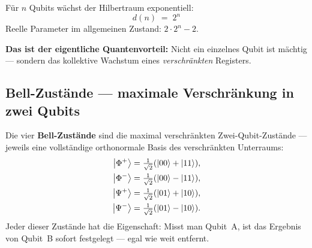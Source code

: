 Für $n$ Qubits wächst der Hilbertraum exponentiell:
\begin{equation}
  \boxed{d(n) \;=\; 2^n}
\end{equation}
Reelle Parameter im allgemeinen Zustand: $2 \cdot 2^n - 2$.

\begin{center}
\end{center}

\textbf{Das ist der eigentliche Quantenvorteil:}
Nicht ein einzelnes Qubit ist mächtig ---
sondern das kollektive Wachstum eines
\emph{verschränkten} Registers.

\subsection{Bell-Zustände --- maximale Verschränkung in zwei Qubits}
\label{sec:bell}

Die vier \textbf{Bell-Zustände} sind die
maximal verschränkten Zwei-Qubit-Zustände ---
jeweils eine vollständige orthonormale Basis
des verschränkten Unterraums:
\begin{align}
  \left|\Phi^+\right\rangle &= \tfrac{1}{\sqrt{2}}(\left|00\right\rangle + \left|11\right\rangle), \\
  \left|\Phi^-\right\rangle &= \tfrac{1}{\sqrt{2}}(\left|00\right\rangle - \left|11\right\rangle), \\
  \left|\Psi^+\right\rangle &= \tfrac{1}{\sqrt{2}}(\left|01\right\rangle + \left|10\right\rangle), \\
  \left|\Psi^-\right\rangle &= \tfrac{1}{\sqrt{2}}(\left|01\right\rangle - \left|10\right\rangle).
\end{align}
Jeder dieser Zustände hat die Eigenschaft:
Misst man Qubit~A, ist das Ergebnis von Qubit~B
sofort festgelegt --- egal wie weit entfernt.

